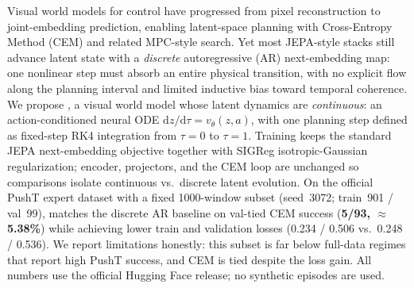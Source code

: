 Visual world models for control have progressed from pixel reconstruction
to joint-embedding prediction, enabling latent-space planning with
Cross-Entropy Method (CEM) and related MPC-style search.
Yet most JEPA-style stacks still advance latent state with a
\emph{discrete} autoregressive (AR) next-embedding map: one nonlinear
step must absorb an entire physical transition, with no explicit flow
along the planning interval and limited inductive bias toward temporal
coherence.
We propose \method{}, a visual world model whose latent dynamics are
\emph{continuous}: an action-conditioned neural ODE
$\mathrm{d}z/\mathrm{d}\tau = v_\theta(z,a)$, with one planning step
defined as fixed-step RK4 integration from $\tau{=}0$ to $\tau{=}1$.
Training keeps the standard JEPA next-embedding objective together with
SIGReg isotropic-Gaussian regularization; encoder, projectors, and the
CEM loop are unchanged so comparisons isolate continuous vs.\ discrete
latent evolution.
On the official PushT expert dataset with a fixed 1000-window subset
(seed~3072; train~901 / val~99), \method{} matches the discrete AR
baseline on val-tied CEM success (\textbf{5/93, $\approx$5.38\%}) while
achieving lower train and validation losses (0.234 / 0.506 vs.\
0.248 / 0.536).
We report limitations honestly: this subset is far below full-data
regimes that report high PushT success, and CEM is tied despite the
loss gain.
All numbers use the official Hugging Face release; no synthetic episodes
are used.
